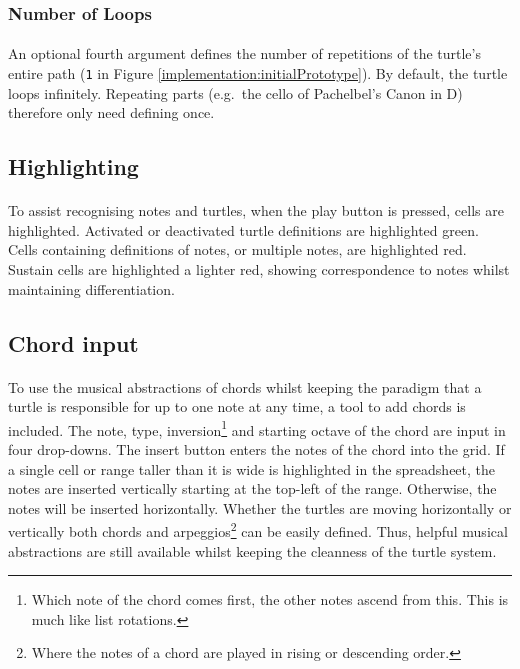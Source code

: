 \vspace{-5pt}
\subsubsection{Number of Loops}

\paragraph{} An optional fourth argument defines the number of repetitions of the turtle's entire path (\texttt{1} in Figure \ref{implementation:initialPrototype}). By default, the turtle loops infinitely. Repeating parts (e.g.~the cello  of Pachelbel's Canon in D) therefore only need defining once.

\subsection{Highlighting}

\paragraph{} To assist recognising notes and turtles, when the play button is pressed, cells are highlighted. Activated or deactivated turtle definitions are highlighted green. Cells containing definitions of notes, or multiple notes, are highlighted red. Sustain cells are highlighted a lighter red, showing correspondence to notes whilst maintaining differentiation.

\subsection{Chord input}

\paragraph{} To use the musical abstractions of chords whilst keeping the paradigm that a turtle is responsible for up to one note at any time, a tool to add chords is included. The note, type, inversion\footnote{Which note of the chord comes first, the other notes ascend from this. This is much like list rotations.} and starting octave of the chord are input in four drop-downs. The insert button enters the notes of the chord into the grid. If a single cell or range taller than it is wide is highlighted in the spreadsheet, the notes are inserted vertically starting at the top-left of the range. Otherwise, the notes will be inserted horizontally. Whether the turtles are moving horizontally or vertically both chords and arpeggios\footnote{Where the notes of a chord are played in rising or descending order.} can be easily defined. Thus, helpful musical abstractions are still available whilst keeping the cleanness of the turtle system.

